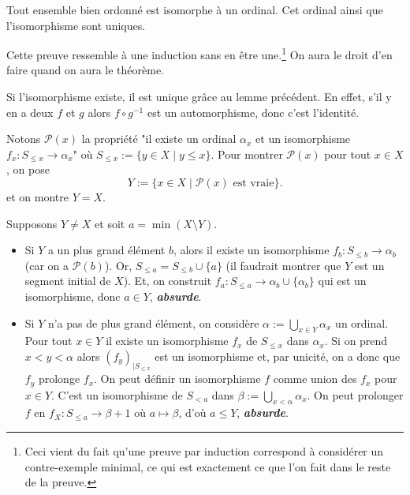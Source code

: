 \documentclass[./main]{subfiles}
\begin{document}
  \begin{thm}
    Tout ensemble bien ordonné est isomorphe à un ordinal. Cet ordinal ainsi que l'isomorphisme sont uniques.
  \end{thm}
  \begin{prv}
    Cette preuve ressemble à une induction sans en être une.\footnote{Ceci vient du fait qu'une preuve par induction correspond à considérer un contre-exemple minimal, ce qui est exactement ce que l'on fait dans le reste de la preuve.}
    On aura le droit d'en faire quand on aura le théorème.

    Si l'isomorphisme existe, il est unique grâce au lemme précédent.
    En effet, s'il y en a deux $f$ et $g$ alors $f \circ g^{-1}$ est un automorphisme, donc c'est l'identité.

    Notons $\mathcal{P}(x)$ la propriété "il existe un ordinal $\alpha_x$ et un isomorphisme $f_x : S_{\le x} \to \alpha_x$" où $S_{\le x} := \{y \in X \mid y \le x\}$.
    Pour montrer $\mathcal{P}(x)$ pour tout $x \in X$, on pose  
    \[
    Y := \{x \in X  \mid \mathcal{P}(x) \text{ est vraie}\}
    .\] 
    et on montre $Y = X$.

    Supposons $Y \neq X$ et soit $a = \min (X \setminus Y)$.
    \begin{itemize}
      \item Si $Y$ a un plus grand élément $b$, alors il existe un isomorphisme $f_b : S_{\le b} \to \alpha_b$ (car on a $\mathcal{P}(b)$).
        Or, $S_{\le a} = S_{\le b} \cup \{a\}$ (il faudrait montrer que $Y$ est un segment initial de $X$).
        Et, on construit $f_a : S_{\le a} \to \alpha_b \cup \{\alpha_b\}$ qui est un isomorphisme, donc $a \in Y$, \textit{\textbf{absurde}}.
      \item Si $Y$ n'a pas de plus grand élément, on considère $\alpha := \bigcup_{x \in Y} \alpha_x$ un ordinal.
        Pour tout $x \in Y$ il existe un isomorphisme $f_x$ de $S_{\le x}$ dans $\alpha_x$.
        Si on prend $x < y < \alpha$ alors  $(f_y)_{|S_{\le x}}$ est un isomorphisme et, par unicité, on a donc que $f_y$ prolonge $f_x$.
        On peut définir un isomorphisme $f$ comme union des $f_{x}$ pour $x \in Y$.
        C'est un isomorphisme de $S_{< a}$ dans $\beta := \bigcup_{x < \alpha} \alpha_x$.
        On peut prolonger $f$ en $f_X : S_{\le a} \to \beta + 1$ où $a \mapsto \beta$, d'où $a \le Y$, \textit{\textbf{absurde}}.
    \end{itemize}
  \end{prv}
\end{document}
